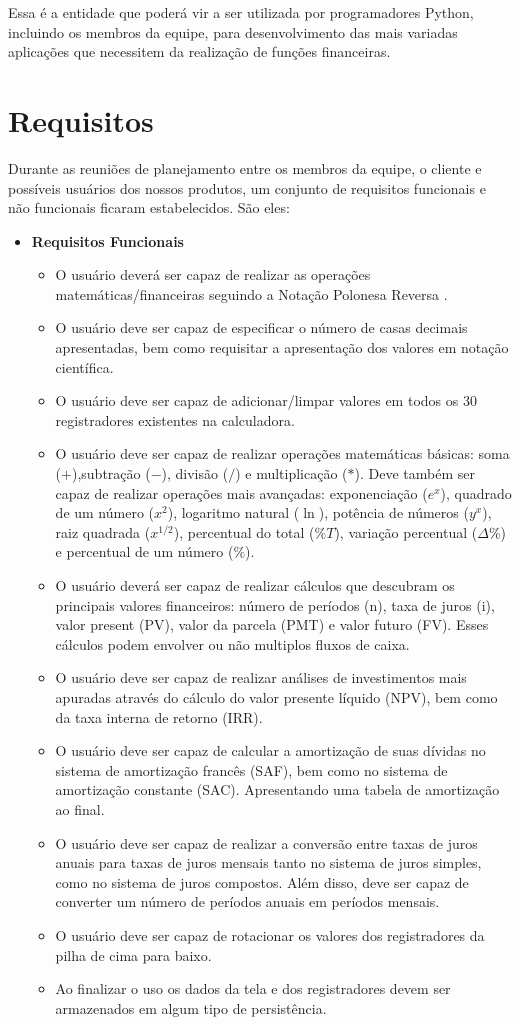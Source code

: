 Essa é a entidade que poderá vir a ser utilizada por programadores Python, incluindo os membros da equipe, para desenvolvimento das mais variadas aplicações que necessitem da realização de funções financeiras.

\section{Requisitos}

Durante as reuniões de planejamento entre os membros da equipe, o cliente e possíveis usuários dos nossos produtos, um conjunto de requisitos funcionais e não funcionais ficaram estabelecidos. São eles:

\begin{itemize}
 \item \textbf{Requisitos Funcionais}
	\begin{itemize}
 	\item O usuário deverá ser capaz de realizar as operações matemáticas/financeiras seguindo a Notação Polonesa Reversa \cite{NPR}.
	\item O usuário deve ser capaz de especificar o número de casas decimais apresentadas, bem como requisitar a apresentação dos valores em notação científica.
	\item O usuário deve ser capaz de adicionar/limpar valores em todos os 30 registradores existentes na calculadora. 
	\item O usuário deve ser capaz de realizar operações matemáticas básicas: soma ($+$),subtração ($-$), divisão ($/$) e multiplicação ($*$). Deve também ser capaz de realizar operações mais avançadas: exponenciação ($ e^{x} $), quadrado de um número ($x^{2}$), logaritmo natural ($\ln$), potência de números ($y^{x}$), raiz quadrada ($x^{1/2}$), percentual do total ($\%T$), variação percentual ($\Delta\%$) e percentual de um número ($\%$).
	\item O usuário deverá ser capaz de realizar cálculos que descubram os principais valores financeiros: número de períodos (n), taxa de juros (i), valor present (PV), valor da parcela (PMT) e valor futuro (FV). Esses cálculos podem envolver ou não multiplos fluxos de caixa.
	\item O usuário deve ser capaz de realizar análises de investimentos mais apuradas através do cálculo do valor presente líquido (NPV), bem como da taxa interna de retorno (IRR).
	\item O usuário deve ser capaz de calcular a amortização de suas dívidas no sistema de amortização francês (SAF), bem como no sistema de amortização constante (SAC). Apresentando uma tabela de amortização ao final.
	\item O usuário deve ser capaz de realizar a conversão entre taxas de juros anuais para taxas de juros mensais tanto no sistema de juros simples, como no sistema de juros compostos. Além disso, deve ser capaz de converter um número de períodos anuais em períodos mensais.
	\item O usuário deve ser capaz de rotacionar os valores dos registradores da pilha de cima para baixo.
	\item Ao finalizar o uso os dados da tela e dos registradores devem ser armazenados em algum tipo de persistência.
	

\end{itemize}
\end{itemize}
